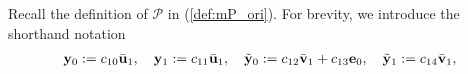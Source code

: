 \documentclass[12pt]{article}
\numberwithin{equation}{section}
\theoremstyle{remark}
\newcommand{\1}{{\rm 1}\kern-0.24em{\rm I}}
\begin{document}
\begin{appendices}
 Recall the definition of $\mathcal{P}$ in (\ref{def:mP_ori}). For brevity, we introduce the shorthand notation
 \begin{align}\label{def:y_ty_eta}
& {\bf y}_0:= c_{10}\bar{\bf u}_1, \quad {\bf y}_1:= c_{11} \bar{\bf u}_1, \quad \tilde{{\bf y}}_0:=c_{12} \bar{\bf v}_1 + c_{13}{\bf e}_0,\quad  \tilde{{\bf y}}_1:= c_{14} \bar{\bf v}_1,\notag\\

\end{align}
\end{appendices}
\end{document}
